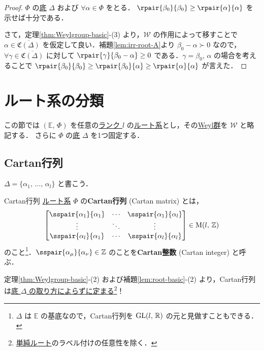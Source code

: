 \documentclass[rep_main]{subfiles}
\begin{document}
\begin{proof}
	$\Phi$ の\hyperref[def:base-root]{底} $\Delta$ および $\forall \alpha \in \Phi$ をとる．
	$\rpair{\beta_0}{\beta_0} \ge \rpair{\alpha}{\alpha}$ を示せば十分である．

	さて，定理\ref{thm:Weylgroup-basic}-(3) より，$\mathscr{W}$ の作用によって移すことで $\alpha \in \overline{\mathfrak{C}(\Delta)}$ を仮定して良い．補題\ref{lem:irr-root-A}より $\beta_0 -\alpha \succ 0$ なので，$\forall \gamma \in \overline{\mathfrak{C}(\Delta)}$ に対して $\rpair{\gamma}{\beta_0 - \alpha} \ge 0$ である．$\gamma = \beta_0,\, \alpha$ の場合を考えることで $\rpair{\beta_0}{\beta_0} \ge \rpair{\beta_0}{\alpha} \ge \rpair{\alpha}{\alpha}$ が言えた．
\end{proof}


\section{ルート系の分類}

この節では $(\mathbb{E},\, \Phi)$ を任意の\hyperref[def:rank-root]{ランク $l$} の\hyperref[ax:root-system]{ルート系}とし，その\hyperref[def:Weylgroup]{Weyl群}を $\mathscr{W}$ と略記する． 
さらに $\Phi$ の\hyperref[def:base-root]{底} $\Delta$ を1つ固定する．

\subsection{Cartan行列}

$\Delta = \{\alpha_1,\, \dots,\, \alpha_l\}$ と書こう．

\begin{mydef}[label=def:Cartan-matrix]{Cartan行列}
	\hyperref[ax:root-system]{ルート系} $\Phi$ の\textbf{Cartan行列} (Cartan matrix) とは，
	\begin{align}
		\mqty[\sspair{\alpha_1}{\alpha_1} &\cdots &\sspair{\alpha_1}{\alpha_l} \\ \vdots &\ddots &\vdots \\ \sspair{\alpha_l}{\alpha_1} &\cdots & \sspair{\alpha_l}{\alpha_l}] \in \Mat{l}{\mathbb{Z}}
	\end{align}
	のこと\footnote{$\Delta$ は $\mathbb{E}$ の基底なので，Cartan行列を $\mathrm{GL}(l,\, \mathbb{R})$ の元と見做すこともできる．}．$\sspair{\alpha_\mu}{\alpha_\nu} \in \mathbb{Z}$ のことを\textbf{Cartan整数} (Cartan integer) と呼ぶ．
\end{mydef}

定理\ref{thm:Weylgroup-basic}-(2) および補題\ref{lem:root-basic}-(2) より，Cartan行列は\underline{底 $\Delta$ の取り方によらずに定まる}\footnote{\hyperref[def:base-root]{単純ルート}のラベル付けの任意性を除く．}！
\end{document}
